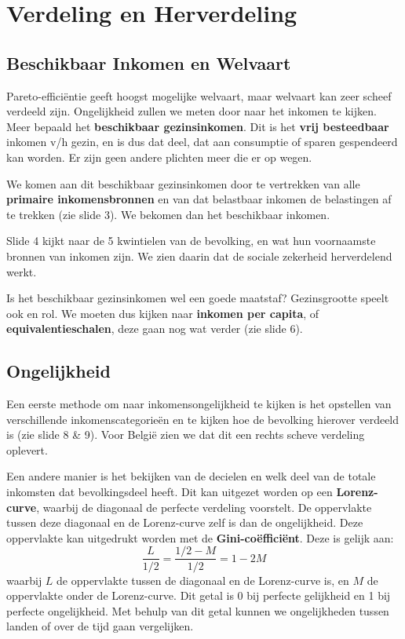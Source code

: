 \section{Verdeling en Herverdeling}
\subsection{Beschikbaar Inkomen en Welvaart}
Pareto-effici\"entie geeft hoogst mogelijke welvaart, maar welvaart kan zeer scheef verdeeld zijn. Ongelijkheid zullen we meten door naar het inkomen te kijken. Meer bepaald het \textbf{beschikbaar gezinsinkomen}. Dit is het \textbf{vrij besteedbaar} inkomen v/h gezin, en is dus dat deel, dat aan consumptie of sparen gespendeerd kan worden. Er zijn geen andere plichten meer die er op wegen.

We komen aan dit beschikbaar gezinsinkomen door te vertrekken van alle \textbf{primaire inkomensbronnen} en van dat belastbaar inkomen de belastingen af te trekken (zie slide 3). We bekomen dan het beschikbaar inkomen.

Slide 4 kijkt naar de 5 kwintielen van de bevolking, en wat hun voornaamste bronnen van inkomen zijn. We zien daarin dat de sociale zekerheid herverdelend werkt.

Is het beschikbaar gezinsinkomen wel een goede maatstaf? Gezinsgrootte speelt ook en rol. We moeten dus kijken naar \textbf{inkomen per capita}, of \textbf{equivalentieschalen}, deze gaan nog wat verder (zie slide 6).

\subsection{Ongelijkheid}
Een eerste methode om naar inkomensongelijkheid te kijken is het opstellen van verschillende inkomenscategorie\"en en te kijken hoe de bevolking hierover verdeeld is (zie slide 8 \& 9). Voor Belgi\"e zien we dat dit een rechts scheve verdeling oplevert.

Een andere manier is het bekijken van de decielen en welk deel van de totale inkomsten dat bevolkingsdeel heeft. Dit kan uitgezet worden op een \textbf{Lorenz-curve}, waarbij de diagonaal de perfecte verdeling voorstelt. De oppervlakte tussen deze diagonaal en de Lorenz-curve zelf is dan de ongelijkheid. Deze oppervlakte kan uitgedrukt worden met de \textbf{Gini-co\"effici\"ent}. Deze is gelijk aan:
\begin{equation}
   \frac{L}{1/2} = \frac{1/2 - M}{1/2} = 1-2M
\end{equation}
waarbij $L$ de oppervlakte tussen de diagonaal en de Lorenz-curve is, en $M$ de oppervlakte onder de Lorenz-curve. Dit getal is 0 bij perfecte gelijkheid en 1 bij perfecte ongelijkheid. Met behulp van dit getal kunnen we ongelijkheden tussen landen of over de tijd gaan vergelijken.

